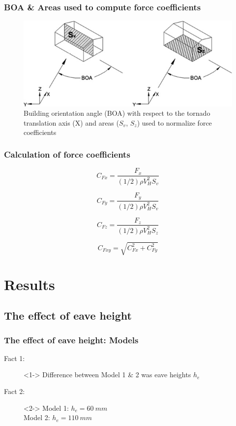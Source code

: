 \documentclass[handout]{beamer}
\begin{document}
\begin{frame}
	\frametitle{BOA \& Areas used to compute force coefficients}
	\begin{figure}
	\centering
	\caption{Building orientation angle (BOA) with respect to the tornado translation axis (X) and areas ($S_v$, $S_z$) used to normalize force coefficients}
		\includegraphics[width=\textwidth]{./fig/3.jpg}
	\end{figure}
	
	
\end{frame}

\begin{frame}
	\frametitle{Calculation of force coefficients}
	\begin{equation}
		C_{Fx}=\frac{F_x}{(1/2)\rho V_H^2 S_v}
	\end{equation}
	
	\begin{equation}
		C_{Fy}=\frac{F_y}{(1/2)\rho V_H^2 S_v}
	\end{equation}
	
	\begin{equation}
		C_{Fz}=\frac{F_z}{(1/2)\rho V_H^2 S_z}
	\end{equation}
	
	\begin{equation}
		C_{Fxy}=\sqrt{C_{Fx}^2+C_{Fy}^2}
	\end{equation}
\end{frame}

\section{Results}
\subsection{The effect of eave height}
\begin{frame}
	\frametitle{The effect of eave height: Models}
	\begin{description}
		\item[Fact 1: ]<1-> Difference between Model 1 \& 2 was \alert{eave heights $h_e$}
		\item[Fact 2: ]<2-> Model 1:  $h_e=\SI{60}{mm}$ \\
		                                         Model 2:  $h_e=\SI{110}{mm}$
	\end{description}
\end{frame}
\end{document}
